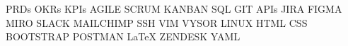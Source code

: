 {\scriptsize 
PRDs
OKRs
KPIs
AGILE SCRUM KANBAN %
SQL
GIT
APIs
JIRA
FIGMA
MIRO
SLACK
MAILCHIMP
SSH
VIM
VYSOR
LINUX
HTML CSS
BOOTSTRAP
POSTMAN
\LaTeX $ $
ZENDESK
YAML
%
}






